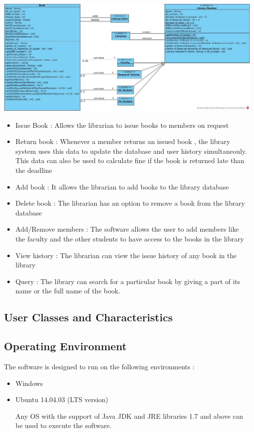 \documentclass{article}
\begin{document}
\includegraphics[scale=0.25]{images/classDiagram}
\\
\begin{itemize}
\item Issue Book : Allows the librarian to issue books to members on request
\item Return book : Whenever a member returns an issued book , the library system uses this data to update the database and user history simultaneouly. This data can also be used to calculate fine if the book is returned late than the deadline
\item Add book : It allows the librarian to add books to the library database
\item Delete book : The librarian has an option to remove a book from the library database
\item Add/Remove members : The software allows the user to add members like the faculty and the other students to have access to the books in the library
\item View history : The librarian can view the issue history of any book in the library
\item Query : The library can search for a particular book by giving a part of its name or the full name of the book.
\end{itemize}

\subsection{User Classes and Characteristics}

\subsection{Operating Environment}
The software is designed to run on the following environments :
\begin{itemize}
\item Windows 
\item Ubuntu 14.04.03 (LTS version)

Any OS with the support of Java JDK and JRE libraries 1.7 and above can be used to execute the software.
\end{itemize}
\end{document}
